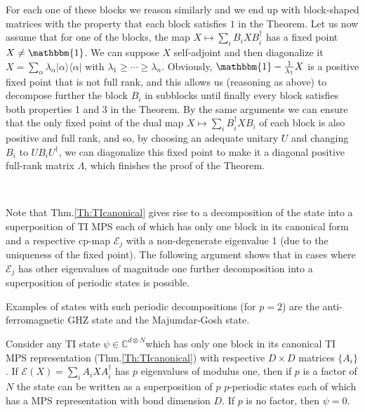 \documentclass[aps,prl,epsfig,graphics,floatfix,mathbbm,a4paper]{article}
\newcommand{\E}{\mathcal{E}}
\newcommand{\1}{\mathbbm{1}}
\renewcommand{\>}{\rangle}
\newcommand{\<}{\langle}
\begin{document}
{    For each one of these blocks we reason similarly and we end up
    with block-shaped matrices with the property that each block
    satisfies $1$ in the Theorem. Let us now assume that for one of
    the blocks, the map $X\mapsto \sum_i B_iXB_i^{\dagger}$ has a
    fixed point $X\not =\mathbbm{1}$. We can suppose $X$ self-adjoint
    and then diagonalize it $X=\sum_\alpha \lambda_\alpha
        |\alpha\>\<\alpha|$ with $\lambda_1\ge\cdots \ge \lambda_n$.
    Obviously, $\mathbbm{1}-\frac{1}{\lambda_1}X$ is a positive fixed
    point that is not full rank, and this allows us (reasoning as
    above) to decompose further the block $B_i$ in subblocks until
    finally every block satisfies both properties 1 and 3 in the
    Theorem. By the same arguments we can ensure that the only fixed
    point of the dual map $X\mapsto \sum_i B_i^{\dagger}XB_i$ of each
    block is also positive and full rank, and so, by choosing an
    adequate unitary $U$ and changing $B_i$ to $UB_iU^{\dagger}$, we
    can diagonalize this fixed point to make it a diagonal positive
    full-rank matrix $\Lambda$, which finishes the proof of the
    Theorem. }

\

Note that Thm.\ref{Th:TIcanonical} gives rise to a decomposition
of the state into a superposition of TI MPS each of which has only
one block in its canonical form and a respective cp-map $\E_j$
with a non-degenerate eigenvalue 1 (due to the uniqueness of the
fixed point). The following argument shows that in cases where
$\E_j$ has other eigenvalues of magnitude one further
decomposition into a superposition of periodic states is possible.

Examples of states with such periodic decompositions  (for $p=2$)
are the anti-ferromagnetic GHZ state and the Majumdar-Gosh state.


\begin{theorem}\label{Th:periodic}
    Consider any TI state $\psi\in\mathbb{C}^{d\otimes N}$which has
    only one block in its canonical TI MPS representation
    (Thm.\ref{Th:TIcanonical}) with respective $D\times D$ matrices
    $\{A_i\}$. If $\E(X)=\sum_iA_iXA_i^\dagger$ has $p$ eigenvalues of
    modulus one, then if $p$ is a factor of $N$ the state can be
    written as a superposition of $p$ $p$-periodic states each of
    which has a MPS representation with bond dimension $D$. If $p$ is
    no factor, then $\psi=0$.
\end{theorem}
\end{document}

